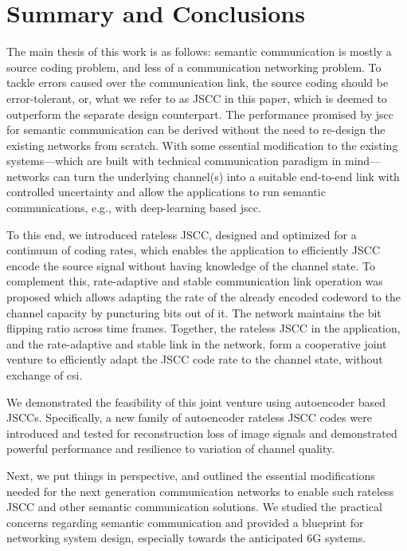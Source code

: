 \section{Summary and Conclusions}
\label{sec:conclusions}

    The main thesis of this work is as follows: semantic communication is mostly a source coding problem, and less of a communication networking problem. To tackle errors caused over the communication link, the source coding should be error-tolerant, or, what we refer to as JSCC in this paper, which is deemed to outperform the separate design counterpart. The performance promised by \gls{jscc}  for semantic communication can be derived without the need to re-design the existing networks from scratch. With some essential modification to the existing systems---which are built with technical communication paradigm in mind---networks can turn the underlying channel(s) into a suitable end-to-end link with controlled uncertainty and allow the applications to run semantic communications, e.g.,  with deep-learning based \gls{jscc}.

    To this end, we  introduced  rateless JSCC, designed and optimized for a continuum of coding rates, which enables the application to efficiently  JSCC encode the source signal without having knowledge of the channel state. To complement this,  rate-adaptive and stable communication link operation was proposed which allows adapting the rate of the already encoded codeword to the channel capacity by  puncturing bits out of it. The network  maintains the bit flipping ratio across time frames. Together, the rateless JSCC in the application, and the rate-adaptive and stable link in the network, form a cooperative joint venture to efficiently adapt the JSCC code rate to the channel state, without exchange of \gls{csi}. 
    
    We demonstrated the feasibility of this joint venture using autoencoder based  JSCCs. Specifically, a new family of  autoencoder rateless JSCC codes were introduced and tested for reconstruction loss of image signals and demonstrated powerful performance and resilience to variation of channel quality.
   
    Next, we put things in perspective, and outlined the essential modifications needed for the next generation communication networks to enable such rateless JSCC and other semantic communication solutions. We studied the practical concerns regarding semantic communication  and provided a blueprint for networking system design, especially towards the anticipated 6G systems.  
